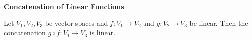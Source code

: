 \textbf{Concatenation of Linear Functions}
 
 
 	Let $V_1,V_2, V_3$ be vector spaces and $f\colon V_1 \to V_2$ and $g\colon V_2 \to V_3$ be linear. Then the concatenation $g \circ f\colon V_1 \to V_3$ is linear.
 
 